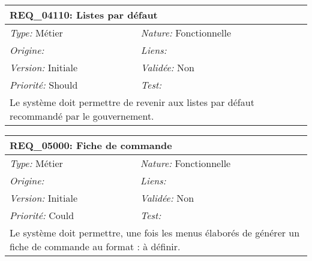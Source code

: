 \begin{table}[!h]

\begin{tabular}{|p{60mm}p{100mm}|}

\hline

\multicolumn{2}{|l|}{\textbf{REQ\_04110:} Listes par défaut} \\ \hline

\emph{Type:} Métier & \emph{Nature:} Fonctionnelle \\

\emph{Origine:}  & \emph{Liens:}  \\

\emph{Version:} Initiale & \emph{Validée:} Non \\

\emph{Priorité:} Should & \emph{Test:} \\ \hline

\multicolumn{2}{|p{16cm}|}{Le système doit permettre de revenir aux listes par défaut recommandé par le gouvernement.} \\ \hline

\end{tabular}

\end{table}



\begin{table}[!h]

\begin{tabular}{|p{60mm}p{100mm}|}

\hline

\multicolumn{2}{|l|}{\textbf{REQ\_05000:} Fiche de commande} \\ \hline

\emph{Type:} Métier & \emph{Nature:} Fonctionnelle \\

\emph{Origine:}  & \emph{Liens:}  \\

\emph{Version:} Initiale & \emph{Validée:} Non \\

\emph{Priorité:} Could & \emph{Test:} \\ \hline

\multicolumn{2}{|p{16cm}|}{Le système doit permettre, une fois les menus élaborés de générer un fiche de commande au format : à définir.} \\ \hline

\end{tabular}

\end{table}



